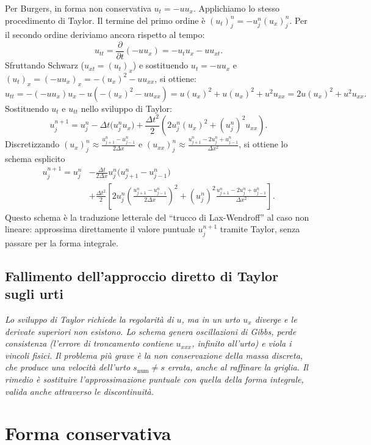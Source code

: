 \documentclass[12pt]{article}
\begin{document}
Per Burgers, in forma non conservativa $u_t=-uu_x$. Applichiamo lo stesso procedimento di Taylor. Il termine del primo ordine è $(u_t)_j^n=-u_j^n(u_x)_j^n$. Per il secondo ordine deriviamo ancora rispetto al tempo:
\[
u_{tt} = \frac{\partial}{\partial t}(-uu_x) = -u_tu_x-uu_{xt}.
\]
Sfruttando Schwarz ($u_{xt}=(u_t)_x$) e sostituendo $u_t=-uu_x$ e $(u_t)_x=(-uu_x)_x=-(u_x)^2-uu_{xx}$, si ottiene:
\[
u_{tt} = -(-uu_x)u_x - u\left(-(u_x)^2 - uu_{xx}\right)
      = u(u_x)^2 + u(u_x)^2 + u^2u_{xx}
      = 2u(u_x)^2 + u^2u_{xx}.
\]
Sostituendo $u_t$ e $u_{tt}$ nello sviluppo di Taylor:
\[
u_j^{n+1} = u_j^n - \Delta t\bigl(u_j^n u_x\bigr) + \frac{\Delta t^2}{2}\left(2u_j^n (u_x)^2 + (u_j^n)^2 u_{xx}\right).
\]
Discretizzando $(u_x)_j^n \approx \frac{u_{j+1}^n-u_{j-1}^n}{2\Delta x}$ e $(u_{xx})_j^n \approx \frac{u_{j+1}^n-2u_j^n+u_{j-1}^n}{\Delta x^2}$, si ottiene lo schema esplicito
\[
\begin{aligned}
u_j^{n+1} = u_j^n &- \frac{\Delta t}{2\Delta x}u_j^n\bigl(u_{j+1}^n-u_{j-1}^n\bigr) \\
&+ \frac{\Delta t^2}{2}\left[
2u_j^n \left(\frac{u_{j+1}^n-u_{j-1}^n}{2\Delta x}\right)^2
+ (u_j^n)^2 \frac{u_{j+1}^n-2u_j^n+u_{j-1}^n}{\Delta x^2}
\right].
\end{aligned}
\]
Questo schema è la traduzione letterale del ``trucco di Lax-Wendroff'' al caso non lineare: approssima direttamente il valore puntuale $u_j^{n+1}$ tramite Taylor, senza passare per la forma integrale.

\subsection{Fallimento dell'approccio diretto di Taylor sugli urti}

\textit{Lo sviluppo di Taylor richiede la regolarità di $u$, ma in un urto $u_x$ diverge e le derivate superiori non esistono. Lo schema genera oscillazioni di Gibbs, perde consistenza (l'errore di troncamento contiene $u_{xxx}$, infinito all'urto) e viola i vincoli fisici. Il problema più grave è la non conservazione della massa discreta, che produce una velocità dell'urto $s_{\text{num}} \neq s$ errata, anche al raffinare la griglia. Il rimedio è sostituire l'approssimazione puntuale con quella della forma integrale, valida anche attraverso le discontinuità.}
\newpage

\section{Forma conservativa}
\end{document}
